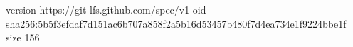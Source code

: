 version https://git-lfs.github.com/spec/v1
oid sha256:5b5f3efdaf7d151ac6b707a858f2a5b16d53457b480f7d4ea734e1f9224bbe1f
size 156

